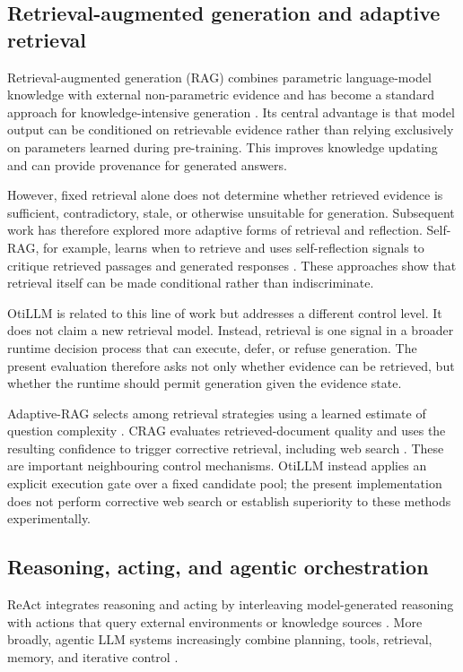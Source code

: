 \documentclass[manuscript, screen, review]{jair}
\begin{document}
\subsection{Retrieval-augmented generation and adaptive retrieval}

Retrieval-augmented generation (RAG) combines parametric language-model
knowledge with external non-parametric evidence and has become a standard
approach for knowledge-intensive generation \citep{lewis2020rag}. Its central
advantage is that model output can be conditioned on retrievable evidence
rather than relying exclusively on parameters learned during pre-training.
This improves knowledge updating and can provide provenance for generated
answers.

However, fixed retrieval alone does not determine whether retrieved evidence is
sufficient, contradictory, stale, or otherwise unsuitable for generation.
Subsequent work has therefore explored more adaptive forms of retrieval and
reflection. Self-RAG, for example, learns when to retrieve and uses
self-reflection signals to critique retrieved passages and generated responses
\citep{asai2024selfrag}. These approaches show that retrieval itself can be made
conditional rather than indiscriminate.

OtiLLM is related to this line of work but addresses a different control level.
It does not claim a new retrieval model. Instead, retrieval is one signal in a
broader runtime decision process that can execute, defer, or refuse generation.
The present evaluation therefore asks not only whether evidence can be
retrieved, but whether the runtime should permit generation given the evidence
state.

Adaptive-RAG selects among retrieval strategies using a learned estimate of
question complexity \citep{jeong2024adaptive}. CRAG evaluates retrieved-document
quality and uses the resulting confidence to trigger corrective retrieval,
including web search \citep{yan2024crag}. These are important neighbouring
control mechanisms. OtiLLM instead applies an explicit execution gate over a
fixed candidate pool; the present implementation does not perform corrective
web search or establish superiority to these methods experimentally.

\subsection{Reasoning, acting, and agentic orchestration}

ReAct integrates reasoning and acting by interleaving model-generated reasoning
with actions that query external environments or knowledge sources
\citep{yao2023react}. More broadly, agentic LLM systems increasingly combine
planning, tools, retrieval, memory, and iterative control \citep{plaat2025agentic}.
\end{document}
